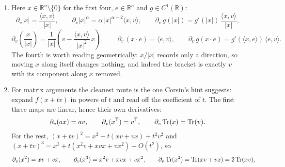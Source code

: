\begin{exercisesolution}
\begin{enumerate}[label=\textbf{(\alph*)}]
\begin{itemize}
        $x_1^2 \leq x_1^2+x_2^2$ gives $|f| \leq |x_2|$. It is not differentiable there:
        \[\partial_vf(0) = \lim_{t\to0}\frac{f(tv)}{t}
          = \lim_{t\to0}\frac{t^3v_1^2v_2}{t^3(v_1^2+v_2^2)} = \frac{v_1^2v_2}{v_1^2+v_2^2},\]
        which exists in every direction and is \emph{not linear} in $v$.
      \item $\dfrac{x_1^2x_2}{x_1^2+x_2^4}$ also satisfies $|f| \leq |x_2|$, so it too extends
        continuously by $0$. Here
        \[\partial_vf(0) = \lim_{t\to0}\frac{t^3v_1^2v_2}{t^3\,(v_1^2 + t^2v_2^4)}
          = \begin{cases} v_2 & v_1 \neq 0,\\ 0 & v_1 = 0,\end{cases}\]
        which is not even continuous in $v$, let alone linear. Again continuous, not
        differentiable.
    \end{itemize}
    All three are instances of \cref{ex:all_directional_derivatives_exist}: every directional
    derivative can exist without the map $v \mapsto \partial_vf(0)$ being linear, and linearity
    is exactly what differentiability demands.
  \item Here $x \in \mathbb{R}^n\setminus\{0\}$ for the first four, $e \in \mathbb{R}^n$ and
    $g \in C^1(\mathbb{R})$:
    \[\partial_v|x| = \frac{\langle x,v\rangle}{|x|}, \qquad
      \partial_v|x|^\alpha = \alpha\,|x|^{\alpha-2}\langle x,v\rangle, \qquad
      \partial_v\,g(|x|) = g'(|x|)\,\frac{\langle x,v\rangle}{|x|},\]
    \[\partial_v\!\left(\frac{x}{|x|}\right)
        = \frac{1}{|x|}\left(v - \frac{\langle x,v\rangle}{|x|^2}\,x\right), \qquad
      \partial_v\,(x\cdot e) = \langle e,v\rangle, \qquad
      \partial_v\,g(x\cdot e) = g'(\langle x,e\rangle)\,\langle e,v\rangle.\]
    The fourth is worth reading geometrically: $x/|x|$ records only a direction, so moving $x$
    along itself changes nothing, and indeed the bracket is exactly $v$ with its component along
    $x$ removed.
  \item For matrix arguments the cleanest route is the one Corsin's hint suggests: expand
    $f(x+tv)$ in powers of $t$ and read off the coefficient of $t$. The first three maps are
    linear, hence their own derivatives:
    \[\partial_v(ax) = av, \qquad \partial_v(x^{\mathsf{T}}) = v^{\mathsf{T}}, \qquad
      \partial_v \operatorname{Tr}(x) = \operatorname{Tr}(v).\]
    For the rest, $(x+tv)^2 = x^2 + t(xv+vx) + t^2v^2$ and
    $(x+tv)^3 = x^3 + t(x^2v + xvx + vx^2) + O(t^2)$, so
    \[\partial_v(x^2) = xv + vx, \qquad \partial_v(x^3) = x^2v + xvx + vx^2, \qquad
      \partial_v\operatorname{Tr}(x^2) = \operatorname{Tr}(xv+vx) = 2\operatorname{Tr}(xv),\]

\end{enumerate}
\end{exercisesolution}
